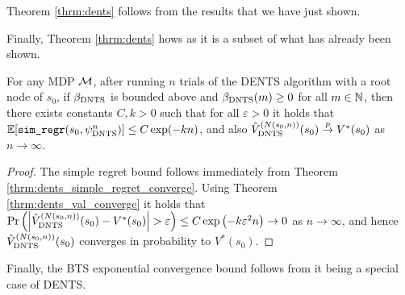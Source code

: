         Theorem \ref{thrm:dents} follows  from the results that we have just shown.


        Finally, Theorem \ref{thrm:dents} hows as it is a subset of what has already been shown.
        \begin{customthm}{4.2}
            For any MDP $\mathcal{M}$, after running $n$ trials of the DENTS algorithm with a root node of $s_0$, if ${\beta_{{\textnormal{DNTS}}}}$ is bounded above and ${\beta_{{\textnormal{DNTS}}}}(m)\geq 0$ for all $m\in\mathbb{N}$, then there exists constants $C,k>0$ such that for all $\varepsilon>0$ it holds that
            $\mathbb{E}[{\textnormal{\texttt{sim\_regr}}}(s_0,{\psi^{n}_{{\textnormal{DNTS}}}})] \leq C\exp(-kn)$, and also ${\hat{V}^{(N(s_0,n))}_{{\textnormal{DNTS}}}}(s_0) \overset{p}{\to} V^*(s_0)$ as $n\rightarrow\infty$.
        \end{customthm}
        \begin{proof}
            The simple regret bound follows immediately from Theorem \ref{thrm:dents_simple_regret_converge}. Using Theorem \ref{thrm:dents_val_converge} it holds that $\Pr\left(\left| {\hat{V}^{(N(s_{0},n))}_{{\textnormal{DNTS}}}}(s_0) - V^*(s_0) \right| > \varepsilon \right) \leq C\exp\left( -k\varepsilon^2 n \right) \rightarrow 0$ as $n\rightarrow \infty$, and hence ${\hat{V}^{(N(s_{0},n))}_{{\textnormal{DNTS}}}}(s_0)$ converges in probability to $V^*(s_0)$.
        \end{proof}





        Finally, the BTS exponential convergence bound follows from it being a special case of DENTS.


















